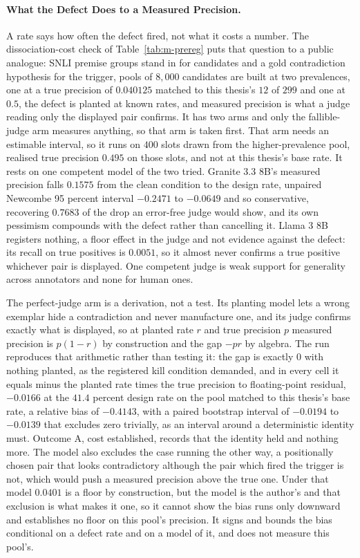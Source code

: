 \paragraph{What the Defect Does to a Measured Precision.} A rate says how often
the defect fired, not what it costs a number. The dissociation-cost check of
Table~\ref{tab:m-prereg} puts that question to a public analogue: SNLI premise
groups stand in for candidates and a gold contradiction hypothesis for the
trigger, pools of $8{,}000$ candidates are built at two prevalences, one at a true
precision of $0.040125$ matched to this thesis's $12$ of $299$ and one at $0.5$, the
defect is planted at known rates, and measured precision is what a judge reading only
the displayed pair confirms. It has two arms and only the fallible-judge arm measures
anything, so that arm is taken first. That arm needs an estimable interval, so it runs
on $400$ slots drawn from the higher-prevalence pool, realised true precision $0.495$
on those slots, and not at this thesis's base rate. It rests on one competent model of
the two tried. Granite
3.3 8B's measured precision falls $0.1575$ from the clean condition to the design
rate, unpaired Newcombe 95 percent interval $-0.2471$ to $-0.0649$ and so
conservative, recovering $0.7683$ of the drop an error-free judge would show, and
its own pessimism compounds with the defect rather than cancelling it. Llama 3 8B
registers nothing, a floor effect in the judge and not evidence against the
defect: its recall on true positives is $0.0051$, so it almost never confirms a
true positive whichever pair is displayed. One competent judge is weak support for
generality across annotators and none for human ones.

The perfect-judge arm is a derivation, not a test. Its planting model lets a wrong
exemplar hide a contradiction and never manufacture one, and its judge confirms
exactly what is displayed, so at planted rate $r$ and true precision $p$ measured
precision is $p(1-r)$ by construction and the gap $-pr$ by algebra. The run
reproduces that arithmetic rather than testing it: the gap is exactly $0$ with
nothing planted, as the registered kill condition demanded, and in every cell it
equals minus the planted rate times the true precision to floating-point residual,
$-0.0166$ at the $41.4$ percent design rate on the pool matched to this thesis's base
rate, a relative bias of $-0.4143$, with a
paired bootstrap interval of $-0.0194$ to $-0.0139$ that excludes zero trivially,
as an interval around a deterministic identity must. Outcome A, cost established,
records that the identity held and nothing more. The model also excludes the case
running the other way, a positionally chosen pair that looks contradictory although
the pair which fired the trigger is not, which would push a measured precision
above the true one. Under that model $0.0401$ is a floor by construction, but the model is the
author's and that exclusion is what makes it one, so it cannot show the bias runs only
downward and establishes no floor on this pool's precision. It signs and bounds the bias conditional on a defect rate and on a model
of it, and does not measure this pool's.


